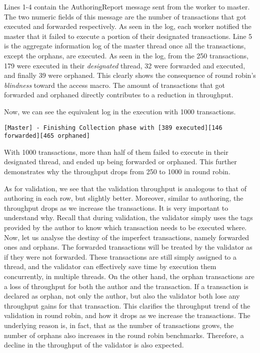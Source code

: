 	Lines 1-4 contain the AuthoringReport message sent from the worker to master. The two numeric
	fields of this message are the number of transactions that got executed and forwarded
	respectively. As seen in the log, each worker notified the master that it failed to execute a
	portion of their designated transactions. Line 5 is the aggregate information log of the master
	thread once all the transactions, except the orphans, are executed. As seen in the log, from the
	250 transactions, 179 were executed in their \textit{designated} thread, 32 were forwarded and
	executed, and finally 39 were orphaned.	This clearly shows the consequence of round robin's \textit{blindness} toward the access macro.
	The amount of transactions that got forwarded and orphaned directly contributes to a reduction
	in throughput. 
	
	Now, we can see the equivalent log in the execution with 1000
	transactions.
	\begin{lstlisting}
[Master] - Finishing Collection phase with [389 executed][146 forwarded][465 orphaned]
	\end{lstlisting}

	With 1000 transactions, more than half of them failed to execute in their designated thread, and
	ended up being forwarded or orphaned. This further demonstrates why the throughput drops from
	250 to 1000 in round robin.

	As for validation, we see that the validation throughput is analogous to that of authoring in
	each row, but slightly better. Moreover, similar to authoring, the throughput drops as we
	increase the transactions. It is very important to understand why. Recall that during
	validation, the validator simply uses the tags provided by the author to know which transaction
	needs to be executed where. Now, let us analyse the destiny of the imperfect transactions,
	namely forwarded ones and orphans. The forwarded transactions will be treated by the validator
	as if they were not forwarded. These transactions are still simply assigned to a thread, and the
	validator can effectively save time by execution them concurrently, in multiple threads. On the
	other hand, the orphan transactions are a loss of throughput for both the author and the
	transaction. If a transaction is declared as orphan, not only the author, but also the validator
	both lose any throughput gains for that transaction. This clarifies the throughput trend of the
	validation in round robin, and how it drops as we increase the transactions. The underlying
	reason is, in fact, that as the number of transactions grows, the number of orphans also
	increases in the round robin benchmarks. Therefore, a decline in the throughput of the validator
	is also expected.


